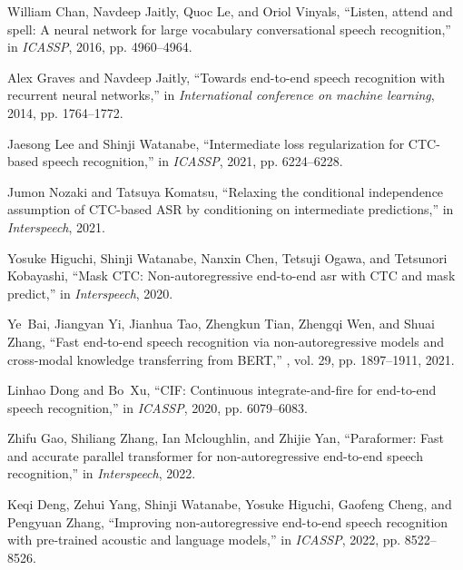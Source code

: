 \documentclass{article}
\begin{document}
\begin{thebibliography}{10}

William Chan, Navdeep Jaitly, Quoc Le, and Oriol Vinyals,
\newblock ``Listen, attend and spell: A neural network for large vocabulary
  conversational speech recognition,''
\newblock in {\em ICASSP}, 2016, pp. 4960--4964.

Alex Graves and Navdeep Jaitly,
\newblock ``Towards end-to-end speech recognition with recurrent neural
  networks,''
\newblock in {\em International conference on machine learning}, 2014, pp.
  1764--1772.

Jaesong Lee and Shinji Watanabe,
\newblock ``Intermediate loss regularization for {CTC}-based speech
  recognition,''
\newblock in {\em ICASSP}, 2021, pp. 6224--6228.

Jumon Nozaki and Tatsuya Komatsu,
\newblock ``Relaxing the conditional independence assumption of {CTC}-based
  {ASR} by conditioning on intermediate predictions,''
\newblock in {\em Interspeech}, 2021.

Yosuke Higuchi, Shinji Watanabe, Nanxin Chen, Tetsuji Ogawa, and Tetsunori
  Kobayashi,
\newblock ``Mask {CTC}: Non-autoregressive end-to-end asr with {CTC} and mask
  predict,''
\newblock in {\em Interspeech}, 2020.

Ye~Bai, Jiangyan Yi, Jianhua Tao, Zhengkun Tian, Zhengqi Wen, and Shuai Zhang,
\newblock ``Fast end-to-end speech recognition via non-autoregressive models
  and cross-modal knowledge transferring from {BERT},''
, vol. 29, pp. 1897--1911, 2021.

Linhao Dong and Bo~Xu,
\newblock ``{CIF}: Continuous integrate-and-fire for end-to-end speech
  recognition,''
\newblock in {\em ICASSP}, 2020, pp. 6079--6083.

Zhifu Gao, Shiliang Zhang, Ian Mcloughlin, and Zhijie Yan,
\newblock ``Paraformer: Fast and accurate parallel transformer for
  non-autoregressive end-to-end speech recognition,''
\newblock in {\em Interspeech}, 2022.

Keqi Deng, Zehui Yang, Shinji Watanabe, Yosuke Higuchi, Gaofeng Cheng, and
  Pengyuan Zhang,
\newblock ``Improving non-autoregressive end-to-end speech recognition with
  pre-trained acoustic and language models,''
\newblock in {\em ICASSP}, 2022, pp. 8522--8526.


\end{thebibliography}
\end{document}
